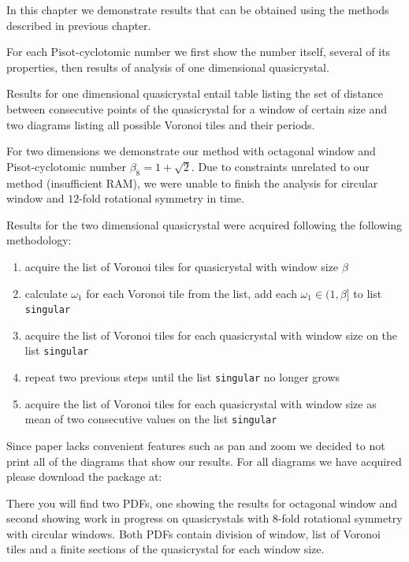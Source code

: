 \documentclass[text.tex]{subfiles}
\begin{document}
In this chapter we demonstrate results that can be obtained using the methods described in previous chapter. 

For each Pisot-cyclotomic number we first show the number itself, several of its properties, then results of analysis of one dimensional quasicrystal.

Results for one dimensional quasicrystal entail table listing the set of distance between consecutive points of the quasicrystal for a window of certain size and two diagrams listing all possible Voronoi tiles and their periods. 

For two dimensions we demonstrate our method with octagonal window and Pisot-cyclotomic number $\beta_8 = 1+\sqrt{2}$. Due to constraints unrelated to our method (insufficient RAM), we were unable to finish the analysis for circular window and $12$-fold rotational symmetry in time. 

Results for the two dimensional quasicrystal were acquired following the following methodology:
\begin{enumerate}
\item acquire the list of Voronoi tiles for quasicrystal with window size $\beta$
\item calculate $\omega_1$ for each Voronoi tile from the list, add each $\omega_1\in(1,\beta]$ to list \texttt{singular}
\item acquire the list of Voronoi tiles for each quasicrystal with window size on the list \texttt{singular}
\item repeat two previous steps until the list \texttt{singular} no longer grows
\item acquire the list of Voronoi tiles for each quasicrystal with window size as mean of two consecutive values on the list \texttt{singular}
\end{enumerate}

Since paper lacks convenient features such as pan and zoom we decided to not print all of the diagrams that show our results. For all diagrams we have acquired please download the package at:\\

There you will find two PDFs, one showing the results for octagonal window and second showing work in progress on quasicrystals with $8$-fold rotational symmetry with circular windows. Both PDFs contain division of window, list of Voronoi tiles and a finite sections of the quasicrystal for each window size. 
\end{document}
